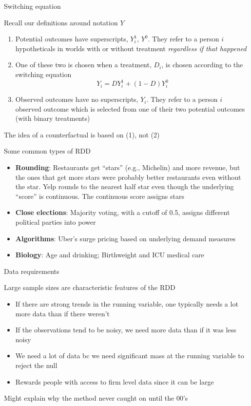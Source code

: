 \documentclass{beamer}
\begin{document}
	
\begin{frame}{Switching equation}

Recall our definitions around notation $Y$

\begin{enumerate}
\item Potential outcomes have superscripts, $Y^1_i$, $Y^0$. They refer to a person $i$ hypotheticals in worlds with or without treatment \emph{regardless if that happened}
\item One of these two is chosen when a treatment, $D_i$, is chosen according to the switching equation $$Y_i = DY^1_i + (1-D)Y^0_i$$
\item Observed outcomes have no superscripts, $Y_i$. They refer to a person $i$ observed outcome which is selected from one of their two potential outcomes (with binary treatments)
\end{enumerate}
\bigskip
The idea of a counterfactual is based on (1), not (2)

\end{frame}




\begin{frame}{Some common types of RDD}

		\begin{itemize}
		\item \textbf{Rounding}: Restaurants get ``stars'' (e.g., Michelin) and more revenue, but the ones that get more stars were probably better restaurants even without the star.  Yelp rounds to the nearest half star even though the underlying ``score'' is continuous.  The continuous score assigns stars
		\item \textbf{Close elections}: Majority voting, with a cutoff of 0.5, assigns different political parties into power
		\item \textbf{Algorithms}: Uber's surge pricing based on underlying demand measures 
		\item \textbf{Biology}: Age and drinking; Birthweight and ICU medical care
		\end{itemize}

\end{frame}

\begin{frame}{Data requirements}

Large sample sizes are characteristic features of the RDD

		\begin{itemize}
		\item If there are strong trends in the running variable, one typically needs a lot more data than if there weren't
		\item If the observations tend to be noisy, we need more data than if it was less noisy
		\item We need a lot of data bc we need significant mass at the running variable to reject the null
		\item Rewards people with access to firm level data since it can be large
		\end{itemize}
Might explain why the method never caught on until the 00's	


\end{frame}
\end{document}
